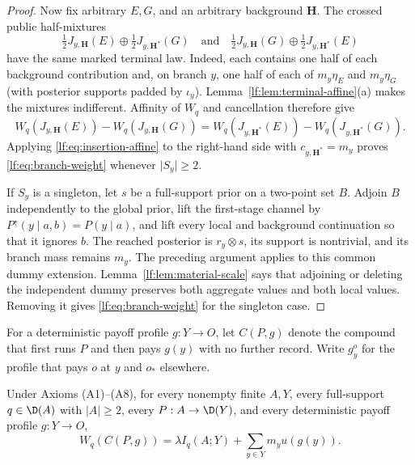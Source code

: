 \begin{proof}
Now fix arbitrary $E,G$, and an arbitrary background $\mathbf H$.  The crossed
public half-mixtures
\[
\tfrac12J_{y,\mathbf H}(E)
\oplus\tfrac12J_{y,\mathbf H^\ast}(G)
\quad\text{and}\quad
\tfrac12J_{y,\mathbf H}(G)
\oplus\tfrac12J_{y,\mathbf H^\ast}(E)
\]
have the same marked terminal law.  Indeed, each contains one half of each
background contribution and, on branch $y$, one half of each of
$m_y\eta_E$ and $m_y\eta_G$ (with posterior supports padded by $\iota_y$).
Lemma~\ref{lf:lem:terminal-affine}\textup{(a)} makes the mixtures indifferent.
Affinity of $W_q$ and cancellation therefore give
\[
W_q(J_{y,\mathbf H}(E))-W_q(J_{y,\mathbf H}(G))
=W_q(J_{y,\mathbf H^\ast}(E))-W_q(J_{y,\mathbf H^\ast}(G)).
\]
Applying \eqref{lf:eq:insertion-affine} to the right-hand side with
$c_{y,\mathbf H^\ast}=m_y$ proves \eqref{lf:eq:branch-weight} whenever
$\lvert S_y\rvert\ge2$.

If $S_y$ is a singleton, let $s$ be a full-support prior on a two-point set
$B$.  Adjoin $B$ independently to the global prior, lift the first-stage
channel by $P^\uparrow(y\mid a,b)=P(y\mid a)$, and lift every local and
background continuation so that it ignores $b$.  The reached posterior is
$r_y\otimes s$, its support is nontrivial, and its branch mass remains $m_y$.
The preceding argument applies to this common dummy extension.
Lemma~\ref{lf:lem:material-scale} says that adjoining or deleting the
independent dummy preserves both aggregate values and both local values.
Removing it gives \eqref{lf:eq:branch-weight} for the singleton case.
\end{proof}

For a deterministic payoff profile $g:Y\to O$, let $C(P,g)$ denote the
compound that first runs $P$ and then pays $g(y)$ with no further record.
Write $g_y^o$ for the profile that pays $o$ at $y$ and $o_\ast$ elsewhere.

\begin{lemma}
\label{lf:lem:deterministic-assembly}\label{lf:lem:branch-increment}
Under Axioms \textup{(A1)--(A8)}, for every nonempty finite $A,Y$, every
full-support $q\in\D(A)$ with $\lvert A\rvert\ge2$, every
$P:A\to\D(Y)$, and every deterministic payoff profile $g:Y\to O$,
\begin{equation}
W_q(C(P,g))
=\lambda I_q(A;Y)+\sum_{y\in Y}m_yu(g(y)).
\label{lf:eq:deterministic-assembly}
\end{equation}
\end{lemma}

